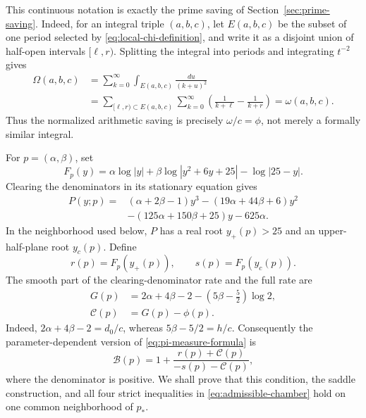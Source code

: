 \documentclass[11pt,reqno,letterpaper]{amsart}
\numberwithin{equation}{section}
\theoremstyle{definition}
\theoremstyle{remark}
\begin{document}
This continuous notation is exactly the prime saving of
Section~\ref{sec:prime-saving}.  Indeed, for an integral triple
\((a,b,c)\), let \(E(a,b,c)\) be the subset of one period selected by
\eqref{eq:local-chi-definition}, and write it as a disjoint union of
half-open intervals \([\ell,r)\).  Splitting the integral into periods
and integrating \(t^{-2}\) gives
\begin{equation}\label{eq:Omega-equals-omega}
 \begin{split}
 \Omega(a,b,c)
 &=\sum_{k=0}^{\infty}\int_{E(a,b,c)}
       \frac{du}{(k+u)^2}\\
 &=\sum_{[\ell,r)\subset E(a,b,c)}\sum_{k=0}^{\infty}
   \left(\frac1{k+\ell}-\frac1{k+r}\right)
 =\omega(a,b,c).
 \end{split}
\end{equation}
Thus the normalized arithmetic saving is precisely
\(\omega/c=\phi\), not merely a formally similar integral.

For \(p=(\alpha,\beta)\), set
\begin{equation}\label{eq:local-general-phase}
 F_p(y)=\alpha\log|y|+\beta\log|y^2+6y+25|
       -\log|25-y|.
\end{equation}
Clearing the denominators in its stationary equation gives
\begin{equation}\label{eq:parameter-stationary-polynomial}
 \begin{split}
 P(y;p)={}&(\alpha+2\beta-1)y^3
 -(19\alpha+44\beta+6)y^2\\
 &-(125\alpha+150\beta+25)y-625\alpha.
 \end{split}
\end{equation}
In the neighborhood used below, \(P\) has a real root \(y_+(p)>25\)
and an upper-half-plane root \(y_c(p)\).  Define
\begin{equation}\label{eq:parameter-r-s}
 r(p)=F_p(y_+(p)),\qquad s(p)=F_p(y_c(p)).
\end{equation}
The smooth part of the clearing-denominator rate and the full rate are
\begin{align}
 G(p)&=2\alpha+4\beta-2
       -\left(5\beta-\frac52\right)\log2,
 \label{eq:local-G-definition}\\
 \mathcal C(p)&=G(p)-\phi(p).
 \label{eq:local-C-definition}
\end{align}
Indeed, \(2\alpha+4\beta-2=d_0/c\), whereas
\(5\beta-5/2=h/c\).  Consequently the parameter-dependent version of
\eqref{eq:pi-measure-formula} is
\begin{equation}\label{eq:local-B-definition}
 \mathcal B(p)=1+
 \frac{r(p)+\mathcal C(p)}{-s(p)-\mathcal C(p)},
\end{equation}
where the denominator is positive.  We shall prove that this condition,
the saddle construction, and all four strict inequalities in
\eqref{eq:admissible-chamber} hold on one common neighborhood of \(p_*\).
\end{document}
